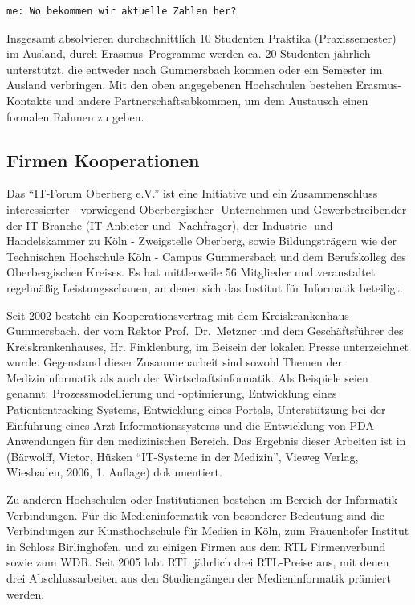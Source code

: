\begin{verbatim}
me: Wo bekommen wir aktuelle Zahlen her?
\end{verbatim}

Insgesamt absolvieren durchschnittlich 10 Studenten Praktika
(Praxissemester) im Ausland, durch Erasmus--Programme werden ca. 20
Studenten jährlich unterstützt, die entweder nach Gummersbach kommen
oder ein Semester im Ausland verbringen. Mit den oben angegebenen
Hochschulen bestehen Erasmus-Kontakte und andere Partnerschaftsabkommen,
um dem Austausch einen formalen Rahmen zu geben.

\subsection{Firmen Kooperationen}\label{firmen-kooperationen}

Das ``IT-Forum Oberberg e.V.'' ist eine Initiative und ein
Zusammenschluss interessierter - vorwiegend Oberbergischer- Unternehmen
und Gewerbetreibender der IT-Branche (IT-Anbieter und -Nachfrager), der
Industrie- und Handelskammer zu Köln - Zweigstelle Oberberg, sowie
Bildungsträgern wie der Technischen Hochschule Köln - Campus Gummersbach
und dem Berufskolleg des Oberbergischen Kreises. Es hat mittlerweile 56
Mitglieder und veranstaltet regelmäßig Leistungsschauen, an denen sich
das Institut für Informatik beteiligt.

Seit 2002 besteht ein Kooperationsvertrag mit dem Kreiskrankenhaus
Gummersbach, der vom Rektor Prof.~Dr.~Metzner und dem Geschäftsführer
des Kreiskrankenhauses, Hr. Finklenburg, im Beisein der lokalen Presse
unterzeichnet wurde. Gegenstand dieser Zusammenarbeit sind sowohl Themen
der Medizininformatik als auch der Wirtschaftsinformatik. Als Beispiele
seien genannt: Prozessmodellierung und -optimierung, Entwicklung eines
Patiententracking-Systems, Entwicklung eines Portals, Unterstützung bei
der Einführung eines Arzt-Informationssystems und die Entwicklung von
PDA-Anwendungen für den medizinischen Bereich. Das Ergebnis dieser
Arbeiten ist in (Bärwolff, Victor, Hüsken ``IT-Systeme in der Medizin'',
Vieweg Verlag, Wiesbaden, 2006, 1. Auflage) dokumentiert.

Zu anderen Hochschulen oder Institutionen bestehen im Bereich der
Informatik Verbindungen. Für die Medieninformatik von besonderer
Bedeutung sind die Verbindungen zur Kunsthochschule für Medien in Köln,
zum Frauenhofer Institut in Schloss Birlinghofen, und zu einigen Firmen
aus dem RTL Firmenverbund sowie zum WDR. Seit 2005 lobt RTL jährlich
drei RTL-Preise aus, mit denen drei Abschlussarbeiten aus den
Studiengängen der Medieninformatik prämiert werden.

